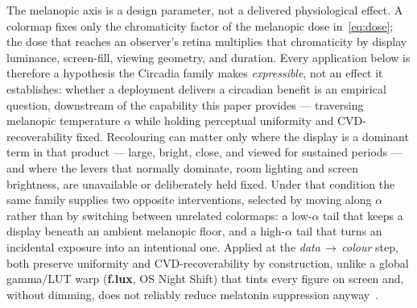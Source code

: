 \documentclass[10pt,a4paper,twocolumn]{article}
\begin{document}
The melanopic axis is a design parameter, not a delivered physiological effect.
A colormap fixes only the chromaticity factor of the melanopic dose in~\eqref{eq:dose}; the dose that reaches an observer's retina multiplies that chromaticity by display luminance, screen-fill, viewing geometry, and duration.
Every application below is therefore a hypothesis the Circadia family makes \emph{expressible}, not an effect it establishes: whether a deployment delivers a circadian benefit is an empirical question, downstream of the capability this paper provides --- traversing melanopic temperature $\alpha$ while holding perceptual uniformity and CVD-recoverability fixed.
Recolouring can matter only where the display is a dominant term in that product --- large, bright, close, and viewed for sustained periods --- and where the levers that normally dominate, room lighting and screen brightness, are unavailable or deliberately held fixed.
Under that condition the same family supplies two opposite interventions, selected by moving along $\alpha$ rather than by switching between unrelated colormaps: a low-$\alpha$ tail that keeps a display beneath an ambient melanopic floor, and a high-$\alpha$ tail that turns an incidental exposure into an intentional one.
Applied at the \emph{data\,$\rightarrow$\,colour} step, both preserve uniformity and CVD-recoverability by construction, unlike a global gamma/LUT warp (\textbf{f.lux}, OS Night Shift) that tints every figure on screen and, without dimming, does not reliably reduce melatonin suppression anyway~\cite{nagare2019nightshift}.
\end{document}
